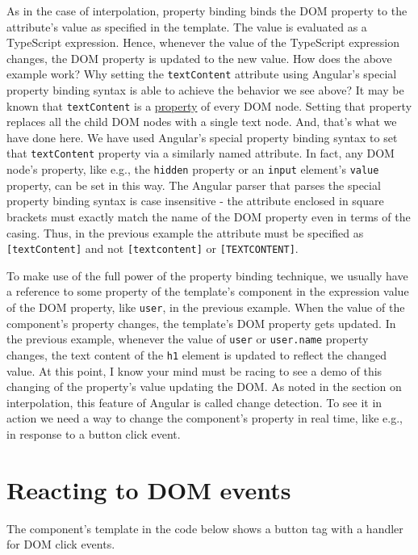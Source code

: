 \documentclass{report}
\begin{document}
As in the case of interpolation, property binding binds the DOM property to the attribute's value as specified in the template. The value is evaluated as a TypeScript expression. Hence, whenever the value of the TypeScript expression changes, the DOM property is updated to the new value. How does the above example work? Why setting the \verb|textContent| attribute using Angular's special property binding syntax is able to achieve the behavior we see above? It may be known that \verb|textContent| is a \href{https://developer.mozilla.org/en-US/docs/Web/API/Node/textContent}{property} of every DOM node. Setting that property replaces all the child DOM nodes with a single text node. And, that's what we have done here. We have used Angular's special property binding syntax to set that  \verb|textContent| property via a similarly named attribute. In fact, any DOM node's property, like e.g., the \verb|hidden| property or an \verb|input| element's \verb|value| property, can be set in this way. The Angular parser that parses the special property binding syntax is case insensitive - the attribute enclosed in square brackets must exactly match the name of the DOM property even in terms of the casing. Thus, in the previous example the attribute must be specified as \verb|[textContent]| and not \verb|[textcontent]| or \verb|[TEXTCONTENT]|.

To make use of the full power of the property binding technique, we usually have a reference to some property of the template's component in the expression value of the DOM property, like \verb|user|, in the previous example. When the value of the component's property changes, the template's DOM property gets updated. In the previous example, whenever the value of \verb|user| or \verb|user.name| property changes, the text content of the \verb|h1| element is updated to reflect the changed value. At this point, I know your mind must be racing to see a demo of this changing of the property's value updating the DOM. As noted in the section on interpolation, this feature of Angular is called change detection. To see it in action we need a way to change the component's property in real time, like e.g., in response to a button click event.

\section{Reacting to DOM events}
The component's template in the code below shows a button tag with a handler for DOM click events.
\end{document}
